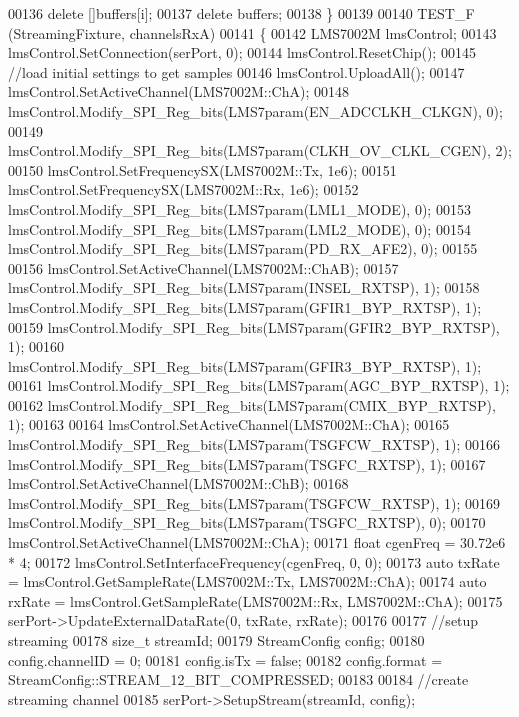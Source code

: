 \begin{DoxyCode}
{00136         \textcolor{keyword}{delete} []buffers[i];
00137     \textcolor{keyword}{delete} buffers;
00138 \}
00139 
00140 TEST_F (StreamingFixture, channelsRxA)
00141 \{
00142     LMS7002M lmsControl;
00143     lmsControl.SetConnection(serPort, 0);
00144     lmsControl.ResetChip();
00145     \textcolor{comment}{//load initial settings to get samples}
00146     lmsControl.UploadAll();
00147     lmsControl.SetActiveChannel(LMS7002M::ChA);
00148     lmsControl.Modify_SPI_Reg_bits(LMS7param(EN_ADCCLKH_CLKGN), 0);
00149     lmsControl.Modify_SPI_Reg_bits(LMS7param(CLKH_OV_CLKL_CGEN), 2);
00150     lmsControl.SetFrequencySX(LMS7002M::Tx, 1e6);
00151     lmsControl.SetFrequencySX(LMS7002M::Rx, 1e6);
00152     lmsControl.Modify_SPI_Reg_bits(LMS7param(LML1_MODE), 0);
00153     lmsControl.Modify_SPI_Reg_bits(LMS7param(LML2_MODE), 0);
00154     lmsControl.Modify_SPI_Reg_bits(LMS7param(PD_RX_AFE2), 0);
00155 
00156     lmsControl.SetActiveChannel(LMS7002M::ChAB);
00157     lmsControl.Modify_SPI_Reg_bits(LMS7param(INSEL_RXTSP), 1);
00158     lmsControl.Modify_SPI_Reg_bits(LMS7param(GFIR1_BYP_RXTSP), 1);
00159     lmsControl.Modify_SPI_Reg_bits(LMS7param(GFIR2_BYP_RXTSP), 1);
00160     lmsControl.Modify_SPI_Reg_bits(LMS7param(GFIR3_BYP_RXTSP), 1);
00161     lmsControl.Modify_SPI_Reg_bits(LMS7param(AGC_BYP_RXTSP), 1);
00162     lmsControl.Modify_SPI_Reg_bits(LMS7param(CMIX_BYP_RXTSP), 1);
00163 
00164     lmsControl.SetActiveChannel(LMS7002M::ChA);
00165     lmsControl.Modify_SPI_Reg_bits(LMS7param(TSGFCW_RXTSP), 1);
00166     lmsControl.Modify_SPI_Reg_bits(LMS7param(TSGFC_RXTSP), 1);
00167     lmsControl.SetActiveChannel(LMS7002M::ChB);
00168     lmsControl.Modify_SPI_Reg_bits(LMS7param(TSGFCW_RXTSP), 1);
00169     lmsControl.Modify_SPI_Reg_bits(LMS7param(TSGFC_RXTSP), 0);
00170     lmsControl.SetActiveChannel(LMS7002M::ChA);
00171     \textcolor{keywordtype}{float} cgenFreq = 30.72e6 * 4;
00172     lmsControl.SetInterfaceFrequency(cgenFreq, 0, 0);
00173     \textcolor{keyword}{auto} txRate = lmsControl.GetSampleRate(LMS7002M::Tx, LMS7002M::ChA);
00174     \textcolor{keyword}{auto} rxRate = lmsControl.GetSampleRate(LMS7002M::Rx, LMS7002M::ChA);
00175     serPort->UpdateExternalDataRate(0, txRate, rxRate);
00176 
00177     \textcolor{comment}{//setup streaming}
00178     \textcolor{keywordtype}{size\_t} streamId;
00179     StreamConfig config;
00180     config.channelID = 0;
00181     config.isTx = \textcolor{keyword}{false};
00182     config.format = StreamConfig::STREAM\_12\_BIT\_COMPRESSED;
00183 
00184     \textcolor{comment}{//create streaming channel}
00185     serPort->SetupStream(streamId, config);
}
\end{DoxyCode}
